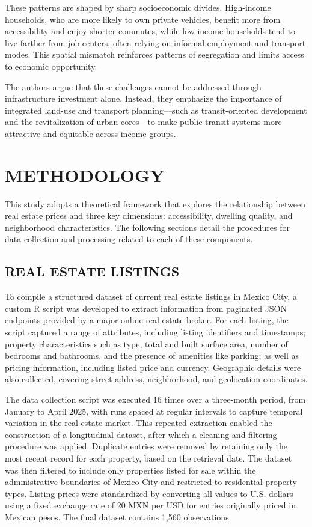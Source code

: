 \documentclass[
  12pt,
]{report}
\begin{document}
These patterns are shaped by sharp socioeconomic divides. High-income
households, who are more likely to own private vehicles, benefit more
from accessibility and enjoy shorter commutes, while low-income
households tend to live farther from job centers, often relying on
informal employment and transport modes. This spatial mismatch
reinforces patterns of segregation and limits access to economic
opportunity.

The authors argue that these challenges cannot be addressed through
infrastructure investment alone. Instead, they emphasize the importance
of integrated land-use and transport planning---such as transit-oriented
development and the revitalization of urban cores---to make public
transit systems more attractive and equitable across income groups.

\newpage

\chapter{METHODOLOGY}\label{methodology}

This study adopts a theoretical framework that explores the relationship
between real estate prices and three key dimensions: accessibility,
dwelling quality, and neighborhood characteristics. The following
sections detail the procedures for data collection and processing
related to each of these components.

\section{REAL ESTATE LISTINGS}\label{real-estate-listings}

To compile a structured dataset of current real estate listings in
Mexico City, a custom R script was developed to extract information from
paginated JSON endpoints provided by a major online real estate broker.
For each listing, the script captured a range of attributes, including
listing identifiers and timestamps; property characteristics such as
type, total and built surface area, number of bedrooms and bathrooms,
and the presence of amenities like parking; as well as pricing
information, including listed price and currency. Geographic details
were also collected, covering street address, neighborhood, and
geolocation coordinates.

The data collection script was executed 16 times over a three-month
period, from January to April 2025, with runs spaced at regular
intervals to capture temporal variation in the real estate market. This
repeated extraction enabled the construction of a longitudinal dataset,
after which a cleaning and filtering procedure was applied. Duplicate
entries were removed by retaining only the most recent record for each
property, based on the retrieval date. The dataset was then filtered to
include only properties listed for sale within the administrative
boundaries of Mexico City and restricted to residential property types.
Listing prices were standardized by converting all values to U.S.
dollars using a fixed exchange rate of 20 MXN per USD for entries
originally priced in Mexican pesos. The final dataset contains 1,560
observations.
\end{document}
